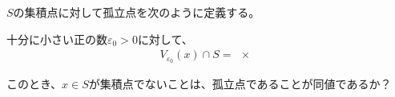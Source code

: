 \begin{problem}
    $S$の集積点に対して孤立点を次のように定義する。

    十分に小さい正の数$\varepsilon_0 > 0$に対して、
    \begin{align*}
        V_{\varepsilon_0}(x) \cap S = \qty{x}
    \end{align*}

    このとき、$x \in S$が集積点でないことは、孤立点であることが同値であるか？
\end{problem}
